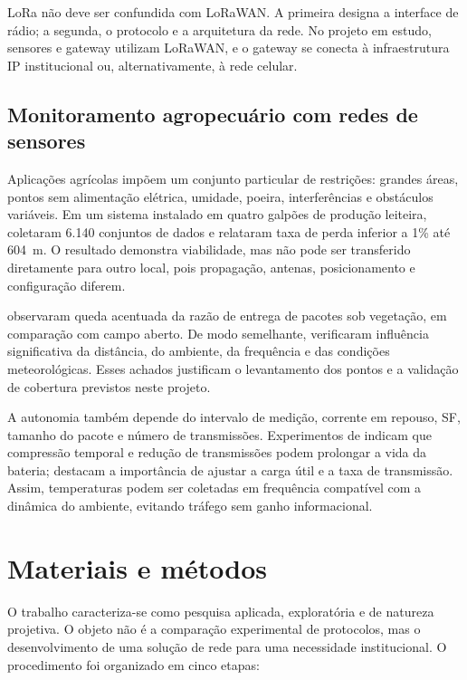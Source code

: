\documentclass[10pt,a4paper,twocolumn]{article}
\begin{document}
LoRa não deve ser confundida com LoRaWAN. A primeira designa a interface de
rádio; a segunda, o protocolo e a arquitetura da rede. No projeto em estudo,
sensores e gateway utilizam LoRaWAN, e o gateway se conecta à infraestrutura IP
institucional ou, alternativamente, à rede celular.

\subsection{Monitoramento agropecuário com redes de sensores}

Aplicações agrícolas impõem um conjunto particular de restrições: grandes áreas,
pontos sem alimentação elétrica, umidade, poeira, interferências e obstáculos
variáveis. Em um sistema instalado em quatro galpões de produção leiteira,
 coletaram 6.140 conjuntos de dados e relataram taxa de perda
inferior a 1\% até \SI{604}{\meter}. O resultado demonstra viabilidade, mas não
pode ser transferido diretamente para outro local, pois propagação, antenas,
posicionamento e configuração diferem.

 observaram queda acentuada da razão de entrega de pacotes
sob vegetação, em comparação com campo aberto. De modo semelhante,
 verificaram influência significativa da distância, do
ambiente, da frequência e das condições meteorológicas. Esses achados justificam
o levantamento dos pontos e a validação de cobertura previstos neste projeto.

A autonomia também depende do intervalo de medição, corrente em repouso, SF,
tamanho do pacote e número de transmissões. Experimentos de
 indicam que compressão temporal e redução de
transmissões podem prolongar a vida da bateria; 
destacam a importância de ajustar a carga útil e a taxa de transmissão. Assim,
temperaturas podem ser coletadas em frequência compatível com a dinâmica do
ambiente, evitando tráfego sem ganho informacional.

\section{Materiais e métodos}

O trabalho caracteriza-se como pesquisa aplicada, exploratória e de natureza
projetiva. O objeto não é a comparação experimental de protocolos, mas o
desenvolvimento de uma solução de rede para uma necessidade institucional. O
procedimento foi organizado em cinco etapas:
\end{document}
